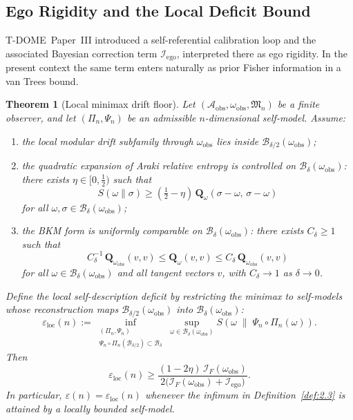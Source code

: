 \documentclass[12pt]{article}
\newtheorem{theorem}{Theorem}[section]
\theoremstyle{definition}
\theoremstyle{remark}
\begin{document}
\subsection{Ego Rigidity and the Local Deficit Bound}\label{subsec:3.2}

T-DOME~Paper~III\cite{TDOMEIII} introduced a self-referential
calibration loop and the associated Bayesian correction term
\(\mathcal{I}_{\mathrm{ego}}\), interpreted there as ego rigidity. In
the present context the same term enters naturally as prior Fisher
information in a van Trees bound.

\begin{theorem}[Local minimax drift floor]\label{thm:3.3}
Let \((\mathcal{A}_{\mathrm{obs}},\omega_{\mathrm{obs}},\mathfrak{M}_n)\)
be a finite observer, and let \((\Pi_n,\Psi_n)\) be an admissible
\(n\)-dimensional self-model. Assume:
\begin{enumerate}[label=(\roman*)]
\item the local modular drift subfamily
through \(\omega_{\mathrm{obs}}\) lies inside
\(\mathcal{B}_{\delta/2}(\omega_{\mathrm{obs}})\);
\item the quadratic expansion of Araki relative entropy is controlled
on \(\mathcal{B}_\delta(\omega_{\mathrm{obs}})\): there exists
\(\eta\in[0,\tfrac{1}{2})\) such that
\[
S(\omega\|\sigma)
\ge
(\tfrac{1}{2}-\eta)\,
\mathbf{Q}_\omega(\sigma-\omega,\,\sigma-\omega)
\]
for all \(\omega,\sigma\in
\mathcal{B}_\delta(\omega_{\mathrm{obs}})\);
\item the BKM form is uniformly comparable on
\(\mathcal{B}_\delta(\omega_{\mathrm{obs}})\): there exists
\(C_\delta\ge 1\) such that
\[
C_\delta^{-1}\,
\mathbf{Q}_{\omega_{\mathrm{obs}}}(v,v)
\le
\mathbf{Q}_\omega(v,v)
\le
C_\delta\,
\mathbf{Q}_{\omega_{\mathrm{obs}}}(v,v)
\]
for all \(\omega\in
\mathcal{B}_\delta(\omega_{\mathrm{obs}})\) and all tangent vectors
\(v\), with \(C_\delta\to 1\) as \(\delta\to 0\).
\end{enumerate}
Define the \emph{local self-description deficit} by restricting the
minimax to self-models whose reconstruction maps
\(\mathcal{B}_{\delta/2}(\omega_{\mathrm{obs}})\) into
\(\mathcal{B}_\delta(\omega_{\mathrm{obs}})\):
\[
\varepsilon_{\mathrm{loc}}(n)
:=
\inf_{\substack{(\Pi_n,\Psi_n)\\[2pt]
\Psi_n\circ\Pi_n(\mathcal{B}_{\delta/2})\subset
\mathcal{B}_\delta}}
\sup_{\omega\in \mathcal{B}_\delta(\omega_{\mathrm{obs}})}
S\!\left(
\omega
\;\middle\|\;
\Psi_n\circ\Pi_n(\omega)
\right).
\]
Then
\[
\varepsilon_{\mathrm{loc}}(n)
\ge
\frac{(1-2\eta)\,\mathcal{I}_F(\omega_{\mathrm{obs}})}
{2\bigl(\mathcal{I}_F(\omega_{\mathrm{obs}})
+
\mathcal{I}_{\mathrm{ego}}\bigr)}.
\]
In particular, \(\varepsilon(n)=\varepsilon_{\mathrm{loc}}(n)\)
whenever the infimum in Definition~\ref{def:2.3} is attained by a
locally bounded self-model.
\end{theorem}
\end{document}
